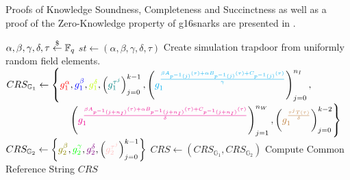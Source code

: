 Proofs of Knowledge Soundness, Completeness and Succinctness as well as a proof of the Zero-Knowledge property of \glspl{g16snark} are presented in \cite{groth_size_2016}.

\begin{Algorithmus}[h] %
    \caption{Procedure to set up the \gls{zps} $GSNARK(DR(QAP(R1CS_r), d_p))$ based on $params:=(\mathbb{G}_1, \mathbb{G}_2, e(\cdot,\cdot),g_1,g_2,\mathbb{F}_q)$.
    Here, $r:\mathbb{F}_q^m\to\mathbb{F}_q^n$ and $DR(QAP(R1CS_r), d_p):\mathcal{I}\times\mathcal{W}\to\{0,1\}$, where $d_p:\mathcal{A}\to\mathcal{I}\times\mathcal{W}$, $\mathcal{I}=\mathbb{F}_q^{n_I}, \mathcal{W}=\mathbb{F}_q^{n_W}$ with $n_I + n_W=m+n+s$ and $\mathcal{A}=\mathbb{F}_q^{m+n+s}$.
    Additionally, $QAP(R1CS)=\left\{T\right\}\cup \bigcup_{j=0}^{n}\left\{\left(A_j, B_j, C_j\right)\right\}$ and $k:=deg(T)$ is the number of constraints in the \gls{qap}.
    }
    \label{alg:setupG16}
    \begin{algorithmic}
        \State $\alpha, \beta, \gamma, \delta, \tau\overset{\$}{\gets} \mathbb{F}_q$
        \State $st\gets (\alpha,\beta,\gamma,\delta,\tau)$ \Comment Create simulation trapdoor from uniformly random field elements.
        \State $CRS_{\mathbb{G}_1}\gets \left\{\textcolor{red}{g_1^\alpha},\textcolor{blue}{g_1^\beta},\textcolor{lime}{g_1^\delta},\left(\textcolor{teal}{g_1^{\tau^j}}\right)_{j=0}^{k-1},\left(\textcolor{cyan}{g_1^{\frac{\beta A_{p^{-1}(j)}(\tau)+\alpha B_{p^{-1}(j)}(\tau)+C_{p^{-1}(j)}(\tau)}{\gamma}}}\right)_{j=0}^{n_I},\right.$
        \Statex $\phantom{CRS_{\mathbb{G}_1}\gets \quad\quad} \left. \left(\textcolor{magenta}{g_1^{\frac{\beta A_{p^{-1}(j+n_I)}(\tau)+\alpha B_{p^{-1}(j+n_I)}(\tau)+C_{p^{-1}(j+n_I)}(\tau)}{\delta}}}\right)_{j=1}^{n_W},\left(\textcolor{brown}{g_1^{\frac{\tau^jT(\tau)}{\delta}}}\right)_{j=0}^{k-2}\right\}$
        \State $CRS_{\mathbb{G}_2}\gets \left\{\textcolor{olive}{g_2^\beta}, \textcolor{green}{g_2^\gamma},\textcolor{violet}{g_2^\delta},\left(\textcolor{pink}{g_2^{\tau^j}}\right)_{j=0}^{k-1}\right\}$
        \State $CRS\gets (CRS_{\mathbb{G}_1},CRS_{\mathbb{G}_2})$ \Comment Compute Common Reference String
        \State \Return $CRS$
    \EndProcedure
    \end{algorithmic}
\end{Algorithmus}

